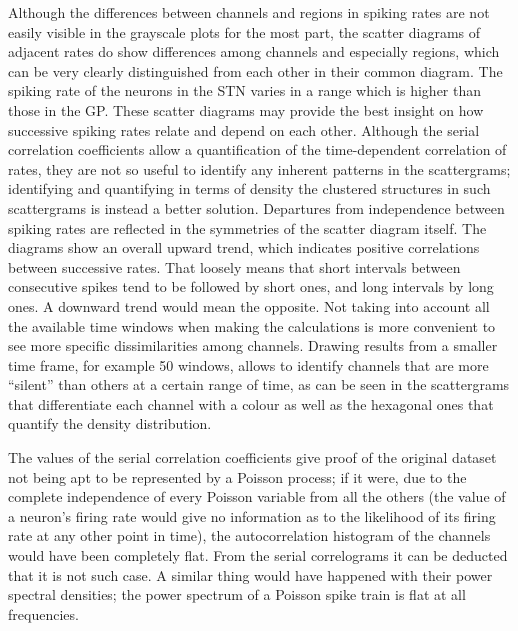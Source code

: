 \documentclass{article}
\begin{document}
Although the differences between channels and regions in spiking rates are not easily visible in the grayscale plots for the most part, the scatter diagrams of adjacent rates do show differences among channels and especially regions, which can be very clearly distinguished from each other in their common diagram. The spiking rate of the neurons in the STN varies in a range which is higher than those in the GP. 
These scatter diagrams may provide the best insight on how successive spiking rates relate and depend on each other. Although the serial correlation coefficients allow a quantification of the time-dependent correlation of rates, they are not so useful to identify any inherent patterns in the scattergrams; identifying and quantifying in terms of density the clustered structures in such scattergrams is instead a better solution. 
Departures from independence between spiking rates are reflected in the symmetries of the scatter diagram itself. The diagrams show an overall upward trend, which indicates positive correlations between successive rates. That loosely means that short intervals between consecutive spikes tend to be followed by short ones, and long intervals by long ones. A downward trend would mean the opposite.
Not taking into account all the available time windows when making the calculations is more convenient to see more specific dissimilarities among channels. Drawing results from a smaller time frame, for example 50 windows, allows to identify channels that are more “silent” than others at a certain range of time, as can be seen in the scattergrams that differentiate each channel with a colour as well as the hexagonal ones that quantify the density distribution. 

The values of the serial correlation coefficients give proof of the original dataset not being apt to be represented by a Poisson process; if it were, due to the complete independence of every Poisson variable from all the others (the value of a neuron’s firing rate would give no information as to the likelihood of its firing rate at any other point in time), the autocorrelation histogram of the channels would have been completely flat. From the serial correlograms it can be deducted that it is not such case. A similar thing would have happened with their power spectral densities; the power spectrum of a Poisson spike train is flat at all frequencies.
\end{document}
